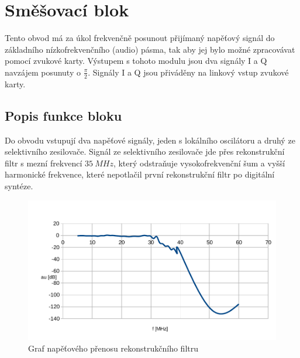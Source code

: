 \clearpage
\section{Směšovací blok}
\indent\indent Tento obvod má za úkol frekvenčně posunout přijímaný napěťový signál do základního nízkofrekvenčního (audio) pásma, tak aby jej bylo možné zpracovávat pomocí zvukové karty. Výstupem s tohoto modulu jsou dva signály I a Q navzájem posunuty o $\frac{\pi}{2}$. Signály I a Q jsou přiváděny na linkový vstup zvukové karty.

\subsection{Popis funkce bloku}
\indent\indent Do obvodu vstupují dva napěťové signály, jeden s lokálního oscilátoru a druhý ze selektivního zesilovače. Signál ze selektivního zesilovače jde přes rekonstrukční filtr s mezní frekvencí $35~MHz$, který odstraňuje vysokofrekvenční šum a vyšší harmonické frekvence, které nepotlačil první rekonstrukční filtr po digitální syntéze.

\begin{figure}[H]
	\centering
	\includegraphics[width=170mm]{img/mix/filtr.pdf}
	\caption{Graf napěťového přenosu rekonstrukčního filtru}    		
\end{figure}

